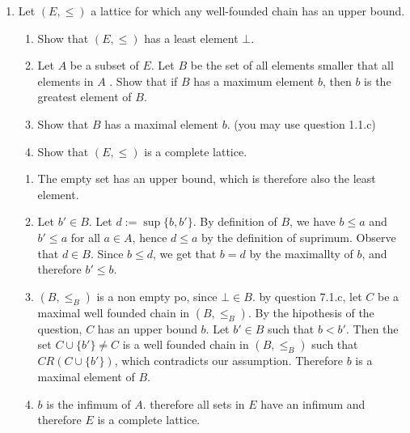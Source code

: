 \documentclass[a4paper,11pt]{exam}
\begin{document}
\begin{questions}
\begin{enumerate}
\begin{solution}
		\end{solution}
		
		
		
		\item Let $(E, \leq)$ a lattice for which any well-founded chain has an upper bound.
		
		\begin{enumerate}
			\item Show that $(E, \leq)$ has a least element $\bot$.
			
			\item Let $ A $ be a subset of $ E $. Let $ B $ be the set of all elements smaller that all elements in $A $ . Show that if $ B $ has a maximum element $ b $, then $ b $ is the greatest element of $ B $.
			
			
			\item Show that $B$ has a maximal element $b$. (you may use question 1.1.c)
			
			\item Show that $(E, \leq)$ is a complete lattice.
		\end{enumerate}
		
		\begin{solution}
			\begin{enumerate}
				\item The empty set has an upper bound, which is therefore also the least element.
				
				\item Let $b' \in B$. Let $d := \sup \{b,b'\}$. By definition of $B$, we have $b \leq a$ and $b' \leq a$ for all $a \in A$, hence $d \leq a$ by the definition of suprimum. Observe that $d \in B$. Since $b \leq d$, we get that $b = d$ by the maximallty of $b$, and therefore $b' \leq b$. 
				
				
				\item $(B, \leq_B)$ is a non empty po, since $\bot \in B$. by question 7.1.c, let $C$ be a maximal well founded chain in $(B, \leq_B)$. By the hipothesis of the question, $C$ has an upper bound $b$. Let $b' \in B$ such that $b < b'$.  Then the set $C \cup \{b'\} \neq C$ is a well founded chain in $(B, \leq_B)$ such that $CR(C \cup \{b'\})$, which contradicts our assumption. Therefore $b$ is a maximal element of $B$.
				
				\item $b$ is the infimum of $A$. therefore all sets in $E$ have an infimum and therefore $E$ is a complete lattice.
			\end{enumerate}
		\end{solution}
	\end{enumerate}
	

\end{questions}
\end{document}
